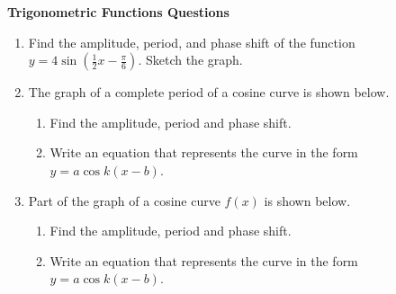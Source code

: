 \documentclass[11pt]{article}
\begin{document}
\centerline{\textbf{Trigonometric Functions Questions}}

\vspace{.5in}






        
\begin{enumerate} 



\item  Find the amplitude, period, and phase shift of the function $\displaystyle y=4\sin\left (\frac{1}{2}x-\frac{\pi}{6}\right )$. Sketch the graph.

\item The graph of a complete period of a cosine curve is shown below.

\begin{enumerate}
\item Find the amplitude, period and phase shift.
\item Write an equation that represents the curve in the form
$\displaystyle y = a \cos k(x - b)$.
\end{enumerate}
\item Part of the graph of  a cosine curve $f(x)$ is shown below.

\begin{center}
\twoptoff
{}
\twopton
\end{center}
\begin{enumerate}
\item Find the amplitude, period and phase shift.
\item Write an equation that represents the curve in the form
$\displaystyle y = a \cos k(x - b)$.
\end{enumerate}


\end{enumerate}
\end{document}

